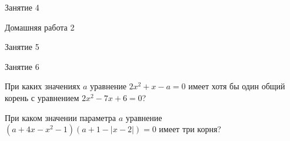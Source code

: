 \begin{class}[number=4]
	\begin{listofex}
		\item Занятие 4
	\end{listofex}
\end{class}

\begin{homework}[number=2]
	\begin{listofex}
		\item Домашняя работа 2
	\end{listofex}
\end{homework}

\begin{class}[number=5]
	\begin{listofex}
		\item Занятие 5
	\end{listofex}
\end{class}

\begin{class}[number=6]
	\begin{listofex}
		\item Занятие 6
	\end{listofex}
\end{class}

\begin{homework}[number=3]
	\begin{listofex}
		\item При каких значениях \( a \) уравнение \( 2x^2+x-a=0 \) имеет хотя бы один общий корень с уравнением \( 2x^2-7x+6=0 \)?
		\item При каком значении параметра \( a \) уравнение \\ \( (a+4x-x^2-1)(a+1-|x-2|)=0 \) имеет три корня?
	\end{listofex}
\end{homework}

